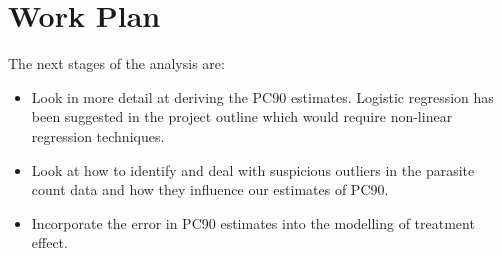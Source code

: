 \section{Work Plan}
The next stages of the analysis are:
\begin{itemize}
\item Look in more detail at deriving the PC90 estimates. Logistic regression has been suggested in the project outline which would require non-linear regression techniques.
\item Look at how to identify and deal with suspicious outliers in the parasite count data and how they influence our estimates of PC90.
\item Incorporate the error in PC90 estimates into the modelling of treatment effect.
\end{itemize}
